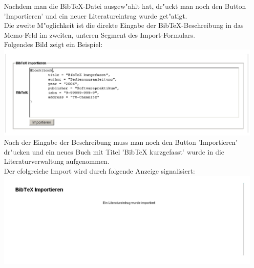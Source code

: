 Nachdem man die BibTeX-Datei ausgew"ahlt hat, dr"uckt man noch den Button 'Importieren' und ein neuer Literatureintrag wurde get"atigt.\\[0.4cm]
Die zweite M"oglichkeit ist die direkte Eingabe der BibTeX-Beschreibung in das Memo-Feld im zweiten, unteren Segment des Import-Formulars.\\
Folgendes Bild zeigt ein Beispiel:\\
\includegraphics[scale=0.8]{import2}\\
Nach der Eingabe der Beschreibung muss man noch den Button 'Importieren' dr"ucken und ein neues Buch mit Titel 'BibTeX kurzgefasst' wurde in die Literaturverwaltung aufgenommen.\\
Der efolgreiche Import wird durch folgende Anzeige signalisiert:\\
\includegraphics[scale=0.8]{import_succ}


